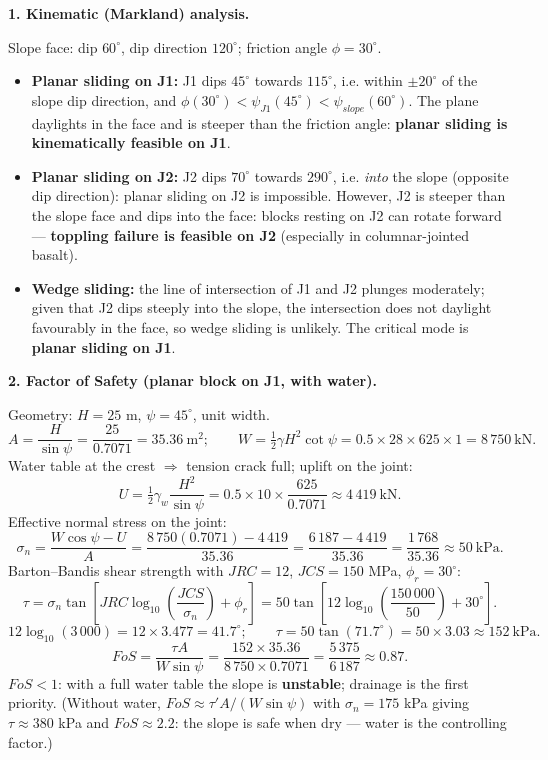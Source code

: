 \documentclass[11pt]{article}
\begin{document}
\begin{corrige}
\textbf{1. Kinematic (Markland) analysis.}\par
Slope face: dip $60^\circ$, dip direction $120^\circ$; friction angle $\phi = 30^\circ$.
\begin{itemize}
\item \textbf{Planar sliding on J1:} J1 dips $45^\circ$ towards $115^\circ$, i.e. within $\pm 20^\circ$ of the slope dip direction, and $\phi (30^\circ) < \psi_{J1} (45^\circ) < \psi_{slope} (60^\circ)$. The plane daylights in the face and is steeper than the friction angle: \textbf{planar sliding is kinematically feasible on J1}.
\item \textbf{Planar sliding on J2:} J2 dips $70^\circ$ towards $290^\circ$, i.e. \emph{into} the slope (opposite dip direction): planar sliding on J2 is impossible. However, J2 is steeper than the slope face and dips into the face: blocks resting on J2 can rotate forward --- \textbf{toppling failure is feasible on J2} (especially in columnar-jointed basalt).
\item \textbf{Wedge sliding:} the line of intersection of J1 and J2 plunges moderately; given that J2 dips steeply into the slope, the intersection does not daylight favourably in the face, so wedge sliding is unlikely. The critical mode is \textbf{planar sliding on J1}.
\end{itemize}

\textbf{2. Factor of Safety (planar block on J1, with water).}\par
Geometry: $H = 25$ m, $\psi = 45^\circ$, unit width.
\[
A = \frac{H}{\sin\psi} = \frac{25}{0.7071} = 35.36\ \mathrm{m^2};\qquad
W = \tfrac{1}{2}\gamma H^2\cot\psi = 0.5 \times 28 \times 625 \times 1 = 8\,750\ \mathrm{kN}.
\]
Water table at the crest $\Rightarrow$ tension crack full; uplift on the joint:
\[
U = \tfrac{1}{2}\gamma_w \frac{H^2}{\sin\psi} = 0.5 \times 10 \times \frac{625}{0.7071} \approx 4\,419\ \mathrm{kN}.
\]
Effective normal stress on the joint:
\[
\sigma_n = \frac{W\cos\psi - U}{A} = \frac{8\,750(0.7071) - 4\,419}{35.36} = \frac{6\,187 - 4\,419}{35.36} = \frac{1\,768}{35.36} \approx 50\ \mathrm{kPa}.
\]
Barton--Bandis shear strength with $JRC = 12$, $JCS = 150$ MPa, $\phi_r = 30^\circ$:
\[
\tau = \sigma_n \tan\!\left[JRC \log_{10}\!\left(\frac{JCS}{\sigma_n}\right) + \phi_r\right]
= 50 \tan\!\left[12\log_{10}\!\left(\frac{150\,000}{50}\right) + 30^\circ\right].
\]
\[
12\log_{10}(3\,000) = 12 \times 3.477 = 41.7^\circ;\qquad
\tau = 50\tan(71.7^\circ) = 50 \times 3.03 \approx 152\ \mathrm{kPa}.
\]
\[
FoS = \frac{\tau A}{W\sin\psi} = \frac{152 \times 35.36}{8\,750 \times 0.7071} = \frac{5\,375}{6\,187} \approx 0.87.
\]
$FoS < 1$: with a full water table the slope is \textbf{unstable}; drainage is the first priority. (Without water, $FoS \approx \tau' A/(W\sin\psi)$ with $\sigma_n = 175$ kPa giving $\tau \approx 380$ kPa and $FoS \approx 2.2$: the slope is safe when dry --- water is the controlling factor.)


\end{corrige}
\end{document}
